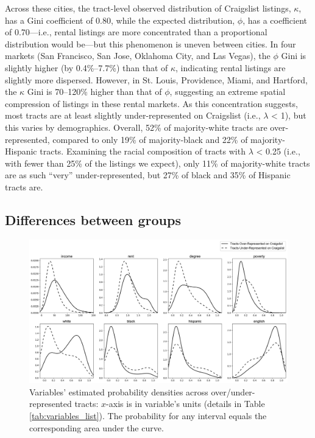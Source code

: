 \documentclass[11pt,letterpaper]{article}
\begin{document}
Across these cities, the tract-level observed distribution of Craigslist listings, $\kappa$, has a Gini coefficient of 0.80, while the expected distribution, $\phi$, has a coefficient of 0.70---i.e., rental listings are more concentrated than a proportional distribution would be---but this phenomenon is uneven between cities. In four markets (San Francisco, San Jose, Oklahoma City, and Las Vegas), the $\phi$ Gini is slightly higher (by 0.4\%--7.7\%) than that of $\kappa$, indicating rental listings are slightly more dispersed. However, in St. Louis, Providence, Miami, and Hartford, the $\kappa$ Gini is 70--120\% higher than that of $\phi$, suggesting an extreme spatial compression of listings in these rental markets. As this concentration suggests, most tracts are at least slightly under-represented on Craigslist (i.e., $\lambda$ < 1), but this varies by demographics. Overall, 52\% of majority-white tracts are over-represented, compared to only 19\% of majority-black and 22\% of majority-Hispanic tracts. Examining the racial composition of tracts with $\lambda$ < 0.25 (i.e., with fewer than 25\% of the listings we expect), only 11\% of majority-white tracts are as such \enquote{very} under-represented, but 27\% of black and 35\% of Hispanic tracts are.

\subsection{Differences between groups}

\begin{figure}[tbp]
	\centering
	\includegraphics[width=1\textwidth]{fig_variable_distributions.png}
	\caption{Variables' estimated probability densities across over/under- represented tracts: $x$-axis is in variable's units (details in Table \ref{tab:variables_list}). The probability for any interval equals the corresponding area under the curve.}
	\label{fig:variable_distributions}
\end{figure}
\end{document}
